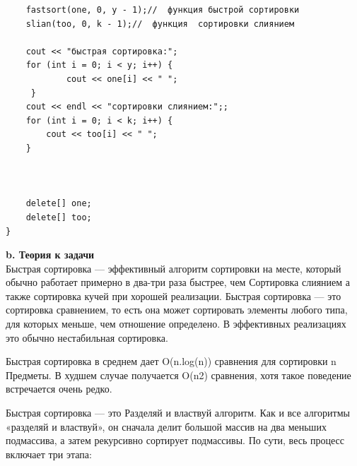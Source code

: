 \documentclass[a4paper, 12pt]{article}
\begin{document}
\begin{flushleft}
\begin{verbatim}
    fastsort(one, 0, y - 1);//  функция быстрой сортировки
    slian(too, 0, k - 1);//  функция  сортировки слиянием
      
    cout << "быстрая сортировка:";
    for (int i = 0; i < y; i++) {
            cout << one[i] << " ";
     }
    cout << endl << "сортировки слиянием:";;
    for (int i = 0; i < k; i++) {
        cout << too[i] << " ";
    }
       
      
    
    delete[] one;
    delete[] too;
}

\end{verbatim}

{\textbf{b. Теория к задачи}}\\




Быстрая сортировка — эффективный алгоритм сортировки на месте, который обычно работает примерно в два-три раза быстрее, чем Сортировка слиянием а также сортировка кучей при хорошей реализации. Быстрая сортировка — это сортировка сравнением, то есть она может сортировать элементы любого типа, для которых меньше, чем отношение определено. В эффективных реализациях это обычно нестабильная сортировка.

Быстрая сортировка в среднем дает O(n.log(n)) сравнения для сортировки n Предметы. В худшем случае получается O(n2) сравнения, хотя такое поведение встречается очень редко.

 Быстрая сортировка — это Разделяй и властвуй алгоритм. Как и все алгоритмы «разделяй и властвуй», он сначала делит большой массив на два меньших подмассива, а затем рекурсивно сортирует подмассивы. По сути, весь процесс включает три этапа:
 

\end{flushleft}
\end{document}
